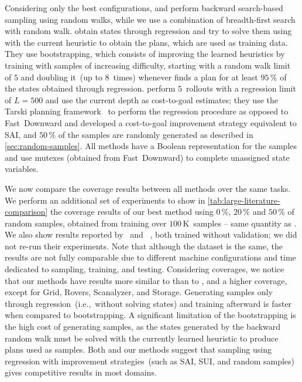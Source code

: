 Considering only the best configurations, \citet{ferber2022neural} and \citet{otoole2022sampling} perform backward search-based sampling using random walks, while we use a combination of breadth-first search with random walk. \citet{ferber2022neural} obtain states through regression and try to solve them using \gbfs with the current heuristic to obtain the plans, which are used as training data. They use bootstrapping, which consists of improving the learned heuristics by training with samples of increasing difficulty, starting with a random walk limit of $5$ and doubling it~(up to $8$~times) whenever \gbfs finds a plan for at least $95\,\%$ of the states obtained through regression. \citet{otoole2022sampling} perform $5$~rollouts with a regression limit of $L=500$ and use the current depth as cost-to-goal estimates; they use the Tarski planning framework~\cite{tarski2018github} to perform the regression procedure as opposed to Fast~Downward and developed a cost-to-goal improvement strategy equivalent to SAI, and $50\,\%$ of the samples are randomly generated as described in \cref{sec:random-samples}. All methods have a Boolean representation for the samples and use mutexes (obtained from Fast~Downward) to complete unassigned state variables.

We now compare the coverage results between all methods over the same tasks. We perform an additional set of experiments to show in \cref{tab:large-literature-comparison} the coverage results of our best method using $0\,\%$, $20\,\%$ and $50\,\%$ of random samples, obtained from training over $100$\,K~samples -- same quantity as \citet{otoole2022sampling}. We also show results reported by \citet{ferber2022neural}~\hboot and \citet{otoole2022sampling}~\hnrsl, both trained without validation; we did not re-run their experiments. Note that although the dataset is the same, the results are not fully comparable due to different machine configurations and time dedicated to sampling, training, and testing. Considering coverages, we notice that our methods have results more similar to \hnrsl than to \hboot, and a higher coverage, except for Grid, Rovers, Scanalyzer, and Storage. Generating samples only through regression~(i.e.,~without solving states) and training afterward is faster when compared to bootstrapping. A significant limitation of the bootstrapping is the high cost of generating samples, as the states generated by the backward random walk must be solved with the currently learned heuristic to produce plans used as samples. Both \hnrsl and our methods suggest that sampling using regression with improvement strategies~(such as SAI, SUI, and random samples) gives competitive results in most domains.

